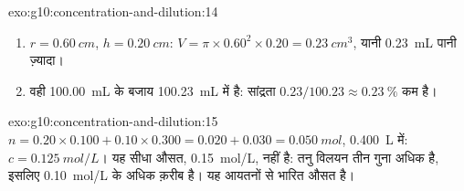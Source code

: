 \begin{solution}{exo:g10:concentration-and-dilution:14}
\begin{enumerate}
  \item $r = \qty{0.60}{cm}$, $h = \qty{0.20}{cm}$:
        $V = \pi \times 0.60^2 \times 0.20 = \qty{0.23}{cm^3}$, यानी
        \qty{0.23}{mL} पानी ज़्यादा।
  \item वही  \qty{100.00}{mL} के बजाय \qty{100.23}{mL} में है:
        सांद्रता $0.23 / 100.23 \approx
        \qty{0.23}{\percent}$ कम है।
\end{enumerate}
\end{solution}

\begin{solution}{exo:g10:concentration-and-dilution:15}
$n = 0.20 \times 0.100 + 0.10 \times 0.300 = 0.020 + 0.030 =
\qty{0.050}{mol}$, \qty{0.400}{L} में: $c = \qty{0.125}{mol/L}$। यह सीधा औसत,
\qty{0.15}{mol/L}, नहीं है: तनु विलयन तीन गुना अधिक है, इसलिए 
\qty{0.10}{mol/L} के अधिक क़रीब है। यह आयतनों से भारित
औसत है।
\end{solution}

